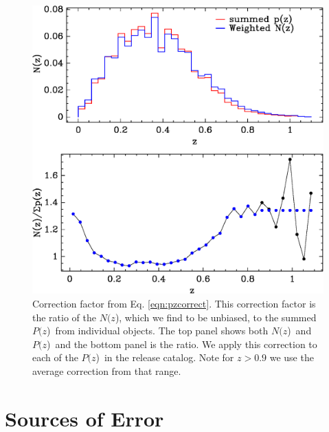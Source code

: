 \documentclass[preprint]{aastex}
\newcommand{\pofz}{$P(z$)}
\newcommand{\nofz}{$N(z$)}
\begin{document}
\begin{figure}[t]\centering
    \includegraphics[scale=0.6]{figures/pofz-correct-12.eps}

    \caption{Correction factor from Eq. \ref{eqn:pzcorrect}.  This correction
    factor is the ratio of the \nofz, which we find to be unbiased, to the summed
    \pofz\ from individual objects. The top panel shows both \nofz\ and \pofz\
    and the bottom panel is the ratio.  We apply this correction to each of the
    \pofz\ in the release catalog.  Note for $z > 0.9$ we use the average
    correction from that range.}

    \label{fig:pzcorr}
    \vspace{2em}
\end{figure}



\section{Sources of Error} \label{sec:errors}
\end{document}
